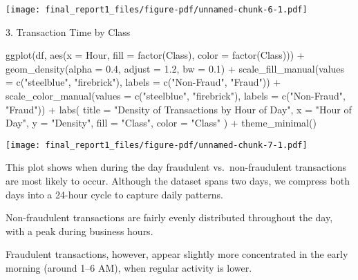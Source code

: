 \documentclass[
  11pt,
  letterpaper,
  DIV=11,
  numbers=noendperiod]{scrartcl}
\newenvironment{Shaded}{}{}
\newcommand{\AttributeTok}[1]{\textcolor[rgb]{0.84,0.23,0.29}{#1}}
\newcommand{\FloatTok}[1]{\textcolor[rgb]{0.00,0.36,0.77}{#1}}
\newcommand{\FunctionTok}[1]{\textcolor[rgb]{0.44,0.26,0.76}{#1}}
\newcommand{\NormalTok}[1]{\textcolor[rgb]{0.14,0.16,0.18}{#1}}
\newcommand{\SpecialCharTok}[1]{\textcolor[rgb]{0.00,0.36,0.77}{#1}}
\newcommand{\StringTok}[1]{\textcolor[rgb]{0.01,0.18,0.38}{#1}}
\begin{document}
\texttt{[image: final\_report1\_files/figure-pdf/unnamed-chunk-6-1.pdf]}

3. Transaction Time by Class

\begin{Shaded}
\begin{Highlighting}[]
\FunctionTok{ggplot}\NormalTok{(df, }\FunctionTok{aes}\NormalTok{(}\AttributeTok{x =}\NormalTok{ Hour, }\AttributeTok{fill =} \FunctionTok{factor}\NormalTok{(Class), }\AttributeTok{color =} \FunctionTok{factor}\NormalTok{(Class))) }\SpecialCharTok{+}
  \FunctionTok{geom\_density}\NormalTok{(}\AttributeTok{alpha =} \FloatTok{0.4}\NormalTok{, }\AttributeTok{adjust =} \FloatTok{1.2}\NormalTok{, }\AttributeTok{bw =} \FloatTok{0.1}\NormalTok{) }\SpecialCharTok{+}
  \FunctionTok{scale\_fill\_manual}\NormalTok{(}\AttributeTok{values =} \FunctionTok{c}\NormalTok{(}\StringTok{"steelblue"}\NormalTok{, }\StringTok{"firebrick"}\NormalTok{), }\AttributeTok{labels =} \FunctionTok{c}\NormalTok{(}\StringTok{"Non{-}Fraud"}\NormalTok{, }\StringTok{"Fraud"}\NormalTok{)) }\SpecialCharTok{+}
  \FunctionTok{scale\_color\_manual}\NormalTok{(}\AttributeTok{values =} \FunctionTok{c}\NormalTok{(}\StringTok{"steelblue"}\NormalTok{, }\StringTok{"firebrick"}\NormalTok{), }\AttributeTok{labels =} \FunctionTok{c}\NormalTok{(}\StringTok{"Non{-}Fraud"}\NormalTok{, }\StringTok{"Fraud"}\NormalTok{)) }\SpecialCharTok{+}
  \FunctionTok{labs}\NormalTok{(}
    \AttributeTok{title =} \StringTok{"Density of Transactions by Hour of Day"}\NormalTok{,}
    \AttributeTok{x =} \StringTok{"Hour of Day"}\NormalTok{,}
    \AttributeTok{y =} \StringTok{"Density"}\NormalTok{,}
    \AttributeTok{fill =} \StringTok{"Class"}\NormalTok{,}
    \AttributeTok{color =} \StringTok{"Class"}
\NormalTok{  ) }\SpecialCharTok{+}
  \FunctionTok{theme\_minimal}\NormalTok{()}
\end{Highlighting}
\end{Shaded}

\texttt{[image: final\_report1\_files/figure-pdf/unnamed-chunk-7-1.pdf]}

This plot shows when during the day fraudulent vs.~non-fraudulent
transactions are most likely to occur. Although the dataset spans two
days, we compress both days into a 24-hour cycle to capture daily
patterns.

Non-fraudulent transactions are fairly evenly distributed throughout the
day, with a peak during business hours.

Fraudulent transactions, however, appear slightly more concentrated in
the early morning (around 1--6 AM), when regular activity is lower.
\end{document}
